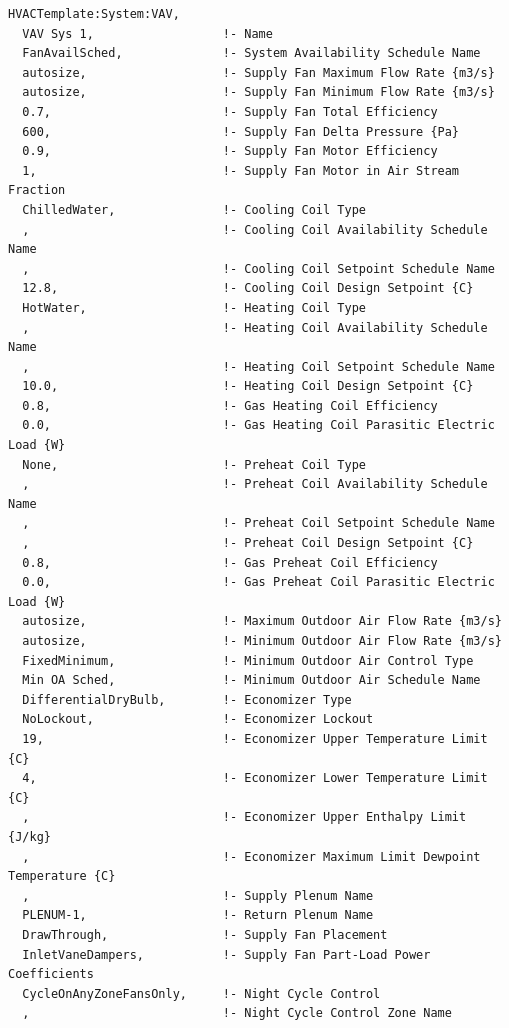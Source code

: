 \begin{lstlisting}
HVACTemplate:System:VAV,
  VAV Sys 1,                  !- Name
  FanAvailSched,              !- System Availability Schedule Name
  autosize,                   !- Supply Fan Maximum Flow Rate {m3/s}
  autosize,                   !- Supply Fan Minimum Flow Rate {m3/s}
  0.7,                        !- Supply Fan Total Efficiency
  600,                        !- Supply Fan Delta Pressure {Pa}
  0.9,                        !- Supply Fan Motor Efficiency
  1,                          !- Supply Fan Motor in Air Stream Fraction
  ChilledWater,               !- Cooling Coil Type
  ,                           !- Cooling Coil Availability Schedule Name
  ,                           !- Cooling Coil Setpoint Schedule Name
  12.8,                       !- Cooling Coil Design Setpoint {C}
  HotWater,                   !- Heating Coil Type
  ,                           !- Heating Coil Availability Schedule Name
  ,                           !- Heating Coil Setpoint Schedule Name
  10.0,                       !- Heating Coil Design Setpoint {C}
  0.8,                        !- Gas Heating Coil Efficiency
  0.0,                        !- Gas Heating Coil Parasitic Electric Load {W}
  None,                       !- Preheat Coil Type
  ,                           !- Preheat Coil Availability Schedule Name
  ,                           !- Preheat Coil Setpoint Schedule Name
  ,                           !- Preheat Coil Design Setpoint {C}
  0.8,                        !- Gas Preheat Coil Efficiency
  0.0,                        !- Gas Preheat Coil Parasitic Electric Load {W}
  autosize,                   !- Maximum Outdoor Air Flow Rate {m3/s}
  autosize,                   !- Minimum Outdoor Air Flow Rate {m3/s}
  FixedMinimum,               !- Minimum Outdoor Air Control Type
  Min OA Sched,               !- Minimum Outdoor Air Schedule Name
  DifferentialDryBulb,        !- Economizer Type
  NoLockout,                  !- Economizer Lockout
  19,                         !- Economizer Upper Temperature Limit {C}
  4,                          !- Economizer Lower Temperature Limit {C}
  ,                           !- Economizer Upper Enthalpy Limit {J/kg}
  ,                           !- Economizer Maximum Limit Dewpoint Temperature {C}
  ,                           !- Supply Plenum Name
  PLENUM-1,                   !- Return Plenum Name
  DrawThrough,                !- Supply Fan Placement
  InletVaneDampers,           !- Supply Fan Part-Load Power Coefficients
  CycleOnAnyZoneFansOnly,     !- Night Cycle Control
  ,                           !- Night Cycle Control Zone Name

\end{lstlisting}
